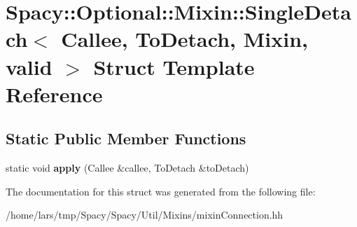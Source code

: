 \hypertarget{structSpacy_1_1Optional_1_1Mixin_1_1SingleDetach}{}\section{Spacy\+:\+:Optional\+:\+:Mixin\+:\+:Single\+Detach$<$ Callee, To\+Detach, Mixin, valid $>$ Struct Template Reference}
\label{structSpacy_1_1Optional_1_1Mixin_1_1SingleDetach}
\subsection*{Static Public Member Functions}
\begin{DoxyCompactItemize}
\item 
static void {\bfseries apply} (Callee \&callee, To\+Detach \&to\+Detach)\hypertarget{structSpacy_1_1Optional_1_1Mixin_1_1SingleDetach_a19a3ca88e4fd73c4c489104add58aba2}{}\label{structSpacy_1_1Optional_1_1Mixin_1_1SingleDetach_a19a3ca88e4fd73c4c489104add58aba2}

\end{DoxyCompactItemize}


The documentation for this struct was generated from the following file\+:\begin{DoxyCompactItemize}
\item 
/home/lars/tmp/\+Spacy/\+Spacy/\+Util/\+Mixins/mixin\+Connection.\+hh\end{DoxyCompactItemize}
